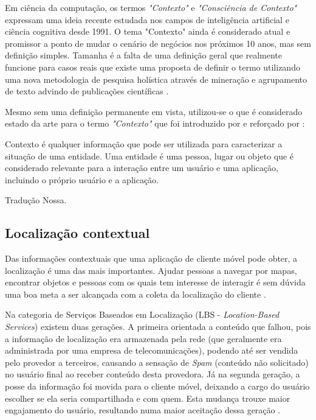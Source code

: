 Em ciência da computação, os termos \emph{"Contexto"} e \emph{"Consciência
de Contexto"} expressam uma ideia recente estudada nos campos de inteligência
artificial e ciência cognitiva desde 1991. O tema "Contexto"  ainda é considerado
atual e promissor a ponto de mudar o cenário de negócios nos próximos 10 anos, mas
sem definição simples. Tamanha é a falta de uma definição geral que
realmente funcione para casos reais que existe uma proposta de definir o termo
utilizando uma nova metodologia de pesquisa holística através de mineração e
agrupamento de texto advindo de publicações científicas \cite{Pascalau2013}.

Mesmo sem uma definição permanente em vista, utilizou-se o que é considerado
estado da arte para o termo \emph{"Contexto"} que foi introduzido por
 e reforçado por :

\begin{citacao}

	Contexto é qualquer informação que pode ser utilizada para caracterizar a
	situação de uma entidade. Uma entidade é uma pessoa, lugar ou objeto que é
	considerado relevante para a interação entre um usuário e uma aplicação,
	incluindo o próprio usuário e a aplicação. \

	 Tradução Nossa.
\end{citacao}

\subsection{Localização contextual}
\label{subsec:Localização contextual}

Das informações contextuais que uma aplicação de cliente móvel pode obter, a
localização é uma das mais importantes. Ajudar pessoas a navegar por mapas,
encontrar objetos e pessoas com os quais tem interesse de interagir é sem dúvida
uma boa meta a ser alcançada com a coleta da localização do cliente
\cite{Bellavista2008}.

Na categoria de Serviços Baseados em Localização (LBS - \emph{Location-Based
Services}) existem duas gerações. A primeira orientada a conteúdo que falhou,
pois a informação de localização era armazenada pela rede (que geralmente era
administrada por uma empresa de telecomunicações), podendo até ser vendida pelo
provedor a terceiros, causando a sensação de \emph{Spam} (conteúdo não
solicitado) no usuário final ao receber conteúdo desta provedora. Já na segunda
geração, a posse da informação foi movida para o cliente móvel, deixando a cargo
do usuário escolher se ela seria compartilhada e com quem. Esta mudança trouxe
maior engajamento do usuário, resultando numa maior aceitação dessa geração
\cite{Bellavista2008}.


